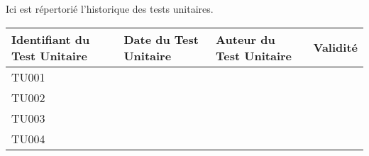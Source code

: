 
Ici est répertorié l'historique des tests unitaires. \\

\begin{table}[H]
\centering
	\begin{tabularx}{17.4cm}{|X|X|X|X|}
	\hline
	\rowcolor{gray!40} Identifiant du Test Unitaire & Date du Test Unitaire & Auteur du Test Unitaire & Validité\\
	\hline
	 TU001 & & & \\
	\hline
	 TU002 & & & \\
	 \hline
	 TU003 & & & \\
	 \hline
	 TU004 & & & \\
	 \hline
	\end{tabularx}
\end{table}

